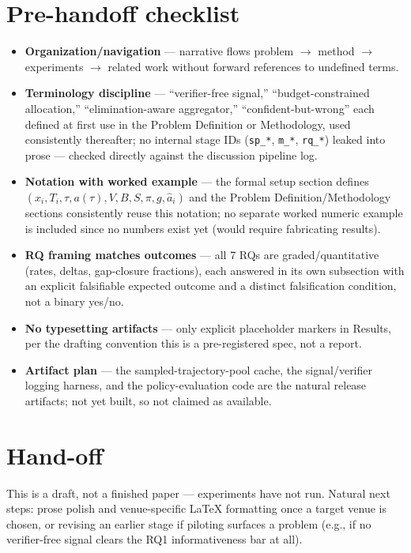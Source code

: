 \documentclass[11pt]{article}
\begin{document}
\section*{Pre-handoff checklist}
\begin{itemize}[leftmargin=1.4em]
\item \textbf{Organization/navigation} --- narrative flows problem $\to$ method $\to$ experiments $\to$ related work without forward references to undefined terms.
\item \textbf{Terminology discipline} --- ``verifier-free signal,'' ``budget-constrained allocation,'' ``elimination-aware aggregator,'' ``confident-but-wrong'' each defined at first use in the Problem Definition or Methodology, used consistently thereafter; no internal stage IDs (\texttt{sp\_*}, \texttt{m\_*}, \texttt{rq\_*}) leaked into prose --- checked directly against the discussion pipeline log.
\item \textbf{Notation with worked example} --- the formal setup section defines $(x_i, T_i, \tau, a(\tau), V, B, S, \pi, g, \hat a_i)$ and the Problem Definition/Methodology sections consistently reuse this notation; no separate worked numeric example is included since no numbers exist yet (would require fabricating results).
\item \textbf{RQ framing matches outcomes} --- all 7 RQs are graded/quantitative (rates, deltas, gap-closure fractions), each answered in its own subsection with an explicit falsifiable expected outcome and a distinct falsification condition, not a binary yes/no.
\item \textbf{No typesetting artifacts} --- only explicit placeholder markers in Results, per the drafting convention this is a pre-registered spec, not a report.
\item \textbf{Artifact plan} --- the sampled-trajectory-pool cache, the signal/verifier logging harness, and the policy-evaluation code are the natural release artifacts; not yet built, so not claimed as available.
\end{itemize}

\section*{Hand-off}
This is a draft, not a finished paper --- experiments have not run. Natural next steps: prose polish and venue-specific LaTeX formatting once a target venue is chosen, or revising an earlier stage if piloting surfaces a problem (e.g., if no verifier-free signal clears the RQ1 informativeness bar at all).



\end{document}
